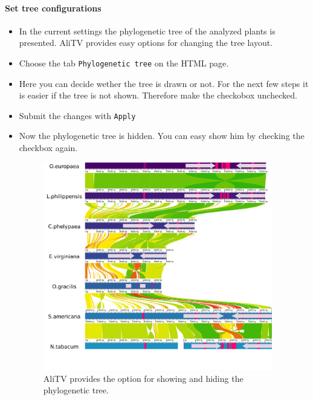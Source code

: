 \documentclass[a4paper]{scrartcl}
\begin{document}
\paragraph*{Set tree configurations}
\begin{itemize}
	\item In the current settings the phylogenetic tree of the analyzed plants is presented. AliTV provides easy options for changing the tree layout.
	\item Choose the tab \texttt{Phylogenetic tree} on the HTML page.
	\item Here you can decide wether the tree is drawn or not. For the next few steps it is easier if the tree is not shown. Therefore make the checkobox unchecked.
	\item Submit the changes with \texttt{Apply}
	\item Now the phylogenetic tree is hidden. You can easy show him by checking the checkbox again.
	\begin{figure}[H]
		\centering
		\includegraphics[width=10cm]{noTree.png}
		\caption{AliTV provides the option for showing and hiding the phylogenetic tree.}
	\end{figure}
\end{itemize}
\end{document}
